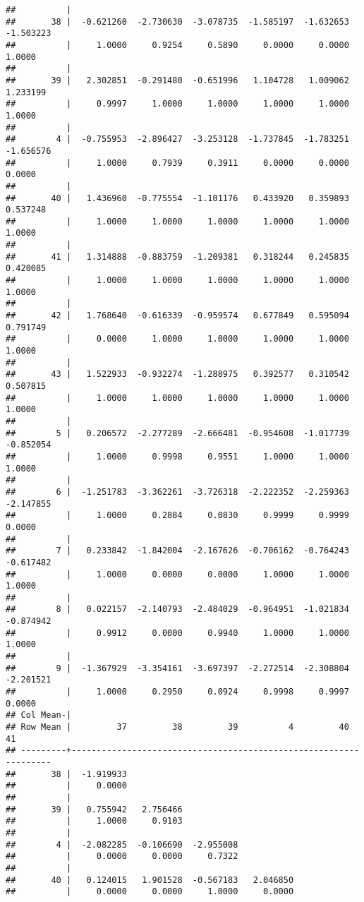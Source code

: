 \documentclass[12pt,]{article}
\begin{document}
\begin{verbatim}
##          |
##       38 |  -0.621260  -2.730630  -3.078735  -1.585197  -1.632653  -1.503223
##          |     1.0000     0.9254     0.5890     0.0000     0.0000     1.0000
##          |
##       39 |   2.302851  -0.291480  -0.651996   1.104728   1.009062   1.233199
##          |     0.9997     1.0000     1.0000     1.0000     1.0000     1.0000
##          |
##        4 |  -0.755953  -2.896427  -3.253128  -1.737845  -1.783251  -1.656576
##          |     1.0000     0.7939     0.3911     0.0000     0.0000     0.0000
##          |
##       40 |   1.436960  -0.775554  -1.101176   0.433920   0.359893   0.537248
##          |     1.0000     1.0000     1.0000     1.0000     1.0000     1.0000
##          |
##       41 |   1.314888  -0.883759  -1.209381   0.318244   0.245835   0.420085
##          |     1.0000     1.0000     1.0000     1.0000     1.0000     1.0000
##          |
##       42 |   1.768640  -0.616339  -0.959574   0.677849   0.595094   0.791749
##          |     0.0000     1.0000     1.0000     1.0000     1.0000     1.0000
##          |
##       43 |   1.522933  -0.932274  -1.288975   0.392577   0.310542   0.507815
##          |     1.0000     1.0000     1.0000     1.0000     1.0000     1.0000
##          |
##        5 |   0.206572  -2.277289  -2.666481  -0.954608  -1.017739  -0.852054
##          |     1.0000     0.9998     0.9551     1.0000     1.0000     1.0000
##          |
##        6 |  -1.251783  -3.362261  -3.726318  -2.222352  -2.259363  -2.147855
##          |     1.0000     0.2884     0.0830     0.9999     0.9999     0.0000
##          |
##        7 |   0.233842  -1.842004  -2.167626  -0.706162  -0.764243  -0.617482
##          |     1.0000     0.0000     0.0000     1.0000     1.0000     1.0000
##          |
##        8 |   0.022157  -2.140793  -2.484029  -0.964951  -1.021834  -0.874942
##          |     0.9912     0.0000     0.9940     1.0000     1.0000     1.0000
##          |
##        9 |  -1.367929  -3.354161  -3.697397  -2.272514  -2.308804  -2.201521
##          |     1.0000     0.2950     0.0924     0.9998     0.9997     0.0000
## Col Mean-|
## Row Mean |         37         38         39          4         40         41
## ---------+------------------------------------------------------------------
##       38 |  -1.919933
##          |     0.0000
##          |
##       39 |   0.755942   2.756466
##          |     1.0000     0.9103
##          |
##        4 |  -2.082285  -0.106690  -2.955008
##          |     0.0000     0.0000     0.7322
##          |
##       40 |   0.124015   1.901528  -0.567183   2.046850
##          |     0.0000     0.0000     1.0000     0.0000

\end{verbatim}
\end{document}
